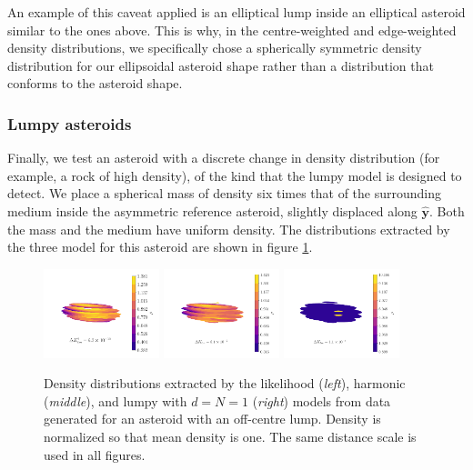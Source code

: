 \documentclass[fleqn,usenatbib]{mnras}
\newcommand{\unit}[1]{\bm{\hat{#1}}}
\begin{document}
An example of this caveat applied is an elliptical lump inside an elliptical asteroid similar to the ones above. This is why, in the centre-weighted and edge-weighted density distributions, we specifically chose a spherically symmetric density distribution for our ellipsoidal asteroid shape rather than a distribution that conforms to the asteroid shape.



\subsubsection{Lumpy asteroids}

Finally, we test an asteroid with a discrete change in density distribution (for example, a rock of high density), of the kind that the lumpy model is designed to detect. We place a spherical mass of density six times that of the surrounding medium inside the asymmetric reference asteroid, slightly displaced along $\unit y$. Both the mass and the medium have uniform density. The distributions extracted by the three model for this asteroid are shown in figure \ref{fig:blob-density}.

\begin{figure}
  \centering
  \includegraphics[width=0.3\textwidth]{figs/blob-likelihood.pdf}\hfill
  \includegraphics[width=0.3\textwidth]{figs/blob-harmonic.pdf}\hfill
  \includegraphics[width=0.3\textwidth]{figs/blob-lumpy.pdf}

  \caption{Density distributions extracted by the likelihood (\textit{left}), harmonic (\textit{middle}), and lumpy with $d=N=1$ (\textit{right}) models from data generated for an asteroid with an off-centre lump. Density is normalized so that mean density is one. The same distance scale is used in all figures.}
  \label{fig:blob-density}
\end{figure}
\end{document}

